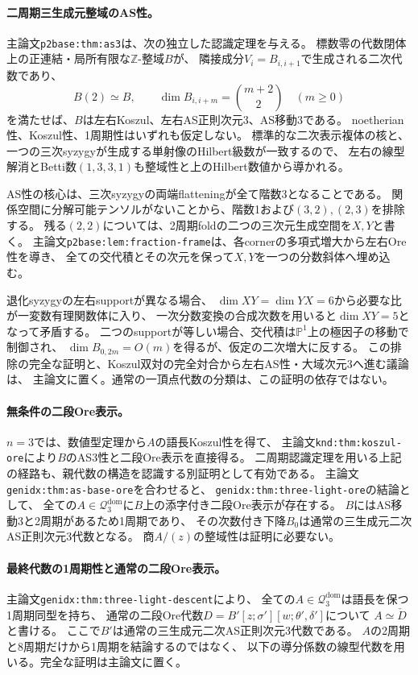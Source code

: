 \documentclass[11pt,a4paper]{ltjsarticle}
\begin{document}
\paragraph{二周期三生成元整域のAS性。}
\label{note:two-period-base-as3}
主論文\texttt{p2base:thm:as3}は、次の独立した認識定理を与える。
標数零の代数閉体上の正連結・局所有限な$\mathbb Z$-整域$B$が、
隣接成分$V_i=B_{i,i+1}$で生成される二次代数であり、
\[
B(2)\simeq B,\qquad
\dim B_{i,i+m}=\binom{m+2}{2}\quad(m\geq0)
\]
を満たせば、$B$は左右Koszul、左右AS正則次元3、AS移動3である。
noetherian性、Koszul性、1周期性はいずれも仮定しない。
標準的な二次表示複体の核と、一つの三次syzygyが生成する単射像のHilbert級数が一致するので、
左右の線型解消とBetti数$(1,3,3,1)$も整域性と上のHilbert数値から導かれる。

AS性の核心は、三次syzygyの両端flatteningが全て階数3となることである。
関係空間に分解可能テンソルがないことから、階数1および$(3,2),(2,3)$を排除する。
残る$(2,2)$については、2周期foldの二つの三次元生成空間を$X,Y$と書く。
主論文\texttt{p2base:lem:fraction-frame}は、各cornerの多項式増大から左右Ore性を導き、
全ての交代積とその次元を保って$X,Y$を一つの分数斜体へ埋め込む。

退化syzygyの左右supportが異なる場合、
$\dim XY=\dim YX=6$から必要な比が一変数有理関数体に入り、
一次分数変換の合成次数を用いると$\dim XY=5$となって矛盾する。
二つのsupportが等しい場合、交代積は$\mathbb P^1$上の極因子の移動で制御され、
$\dim B_{0,2m}=O(m)$を得るが、仮定の二次増大に反する。
この排除の完全な証明と、Koszul双対の完全対合から左右AS性・大域次元3へ進む議論は、
主論文に置く。通常の一頂点代数の分類は、この証明の依存ではない。

\paragraph{無条件の二段Ore表示。}
$n=3$では、数値型定理から$A$の語長Koszul性を得て、
主論文\texttt{knd:thm:koszul-ore}により$B$のAS3性と二段Ore表示を直接得る。
二周期認識定理を用いる上記の経路も、親代数の構造を認識する別証明として有効である。
主論文\texttt{genidx:thm:as-base-ore}を合わせると、
\texttt{genidx:thm:three-light-ore}の結論として、
全ての$A\in\mathcal Q_3^{\mathrm{dom}}$に$B$上の添字付き二段Ore表示が存在する。
$B$にはAS移動3と2周期があるため1周期であり、
その次数付き下降$B_0$は通常の三生成元二次AS正則次元3代数となる。
商$A/(z)$の整域性は証明に必要ない。

\paragraph{最終代数の1周期性と通常の二段Ore表示。}
\label{note:three-light-descent}
主論文\texttt{genidx:thm:three-light-descent}により、
全ての$A\in\mathcal Q_3^{\mathrm{dom}}$は語長を保つ1周期同型を持ち、
通常の二段Ore代数$D=B'[z;\sigma'][w;\theta',\delta']$について
$A\simeq\check D$と書ける。
ここで$B'$は通常の三生成元二次AS正則次元3代数である。
$A$の2周期と8周期だけから1周期を結論するのではなく、
以下の導分係数の線型代数を用いる。完全な証明は主論文に置く。
\end{document}
